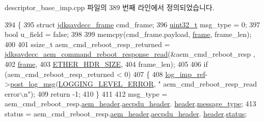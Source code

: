 descriptor\+\_\+base\+\_\+imp.\+cpp 파일의 389 번째 라인에서 정의되었습니다.


\begin{DoxyCode}
394 \{
395     \textcolor{keyword}{struct }\hyperlink{structjdksavdecc__frame}{jdksavdecc\_frame} cmd\_frame;
396     \hyperlink{parse_8c_a6eb1e68cc391dd753bc8ce896dbb8315}{uint32\_t} msg\_type = 0;
397     \textcolor{keywordtype}{bool} u\_field = \textcolor{keyword}{false};
398 
399     memcpy(cmd\_frame.payload, \hyperlink{gst__avb__playbin_8c_ac8e710e0b5e994c0545d75d69868c6f0}{frame}, frame\_len);
400 
401     ssize\_t aem\_cmd\_reboot\_resp\_returned = 
      \hyperlink{group__command__reboot__response_ga4c55ee085228ad590101ad2c710834e0}{jdksavdecc\_aem\_command\_reboot\_response\_read}(&aem\_cmd\_reboot\_resp
      ,
402                                                                                        
      \hyperlink{gst__avb__playbin_8c_ac8e710e0b5e994c0545d75d69868c6f0}{frame},
403                                                                                        
      \hyperlink{namespaceavdecc__lib_a6c827b1a0d973e18119c5e3da518e65ca9512ad9b34302ba7048d88197e0a2dc0}{ETHER\_HDR\_SIZE},
404                                                                                        frame\_len);
405 
406     \textcolor{keywordflow}{if} (aem\_cmd\_reboot\_resp\_returned < 0)
407     \{
408         \hyperlink{namespaceavdecc__lib_acbe3e2a96ae6524943ca532c87a28529}{log\_imp\_ref}->\hyperlink{classavdecc__lib_1_1log_a68139a6297697e4ccebf36ccfd02e44a}{post\_log\_msg}(\hyperlink{namespaceavdecc__lib_a501055c431e6872ef46f252ad13f85cdaf2c4481208273451a6f5c7bb9770ec8a}{LOGGING\_LEVEL\_ERROR}, \textcolor{stringliteral}{"
      aem\_cmd\_reboot\_resp\_read error\(\backslash\)n"});
409         \textcolor{keywordflow}{return} -1;
410     \}
411 
412     msg\_type = aem\_cmd\_reboot\_resp.\hyperlink{structjdksavdecc__aem__command__reboot__response_ae1e77ccb75ff5021ad923221eab38294}{aem\_header}.\hyperlink{structjdksavdecc__aecpdu__aem_ae8460ae179666e7ce268ed1ef33d0de3}{aecpdu\_header}.
      \hyperlink{structjdksavdecc__aecpdu__common_a314cacb6a61bcf18749030c0b6fb7510}{header}.\hyperlink{structjdksavdecc__aecpdu__common__control__header_aeaaffeace8c23899e558022f62ce6de4}{message\_type};
413     status = aem\_cmd\_reboot\_resp.\hyperlink{structjdksavdecc__aem__command__reboot__response_ae1e77ccb75ff5021ad923221eab38294}{aem\_header}.\hyperlink{structjdksavdecc__aecpdu__aem_ae8460ae179666e7ce268ed1ef33d0de3}{aecpdu\_header}.
      \hyperlink{structjdksavdecc__aecpdu__common_a314cacb6a61bcf18749030c0b6fb7510}{header}.\hyperlink{structjdksavdecc__aecpdu__common__control__header_ade818037fd6c985038ff29656089758d}{status};

\end{DoxyCode}
